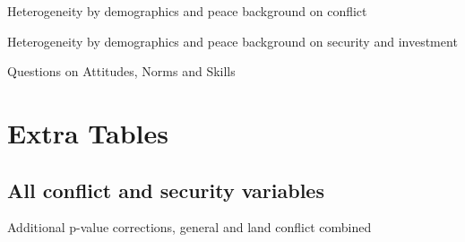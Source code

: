 \documentclass[10pt]{article}
\begin{document}
\begin{landscape}
\begin{table}[H]
\caption{Heterogeneity by demographics and peace background on conflict}
\begin{center}
\begin{adjustbox}{max width = 1.5\textheight}

\end{adjustbox}
\end{center}
\end{table}

\begin{table}[H]
\caption{Heterogeneity by demographics and peace background on security and investment}
\begin{center}
\begin{adjustbox}{max width = 1.5\textheight}

\end{adjustbox}
\end{center}
\end{table}
\end{landscape}


\begin{table}[H]
\caption{Questions on Attitudes, Norms and Skills}
\begin{center}
\begin{adjustbox}{max width = 1.5\textheight}
\end{adjustbox}
\end{center}
\end{table}

\section{Extra Tables}
\clearpage
\setcounter{table}{0}   
\renewcommand{\thetable}{E.\arabic{table}}

\subsection{All conflict and security variables}

\begin{table}[H]
\caption{Additional p-value corrections, general and land conflict combined}
\begin{center}
\begin{adjustbox}{max width = \textwidth}

\end{adjustbox}
\end{center}
\end{table}
\end{document}
